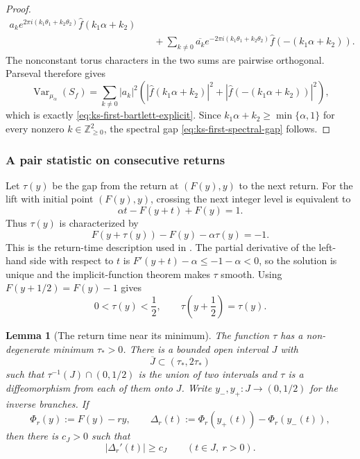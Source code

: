 \documentclass[11pt,reqno,a4paper]{amsart}
\numberwithin{equation}{section}
\theoremstyle{compact}
\newtheorem{lemma}[lemma]{Lemma}
\theoremstyle{definition}
\theoremstyle{definition}
\newcommand{\Var}{\operatorname{Var}}
\begin{document}
\begin{proof}
\begin{align*}
   a_ke^{2\pi i(k_1\theta_1+k_2\theta_2)}
     \widehat f(k_1\alpha+k_2)\\
 &\quad+
   \sum_{k\neq0}
   \overline{a_k}e^{-2\pi i(k_1\theta_1+k_2\theta_2)}
     \widehat f(-(k_1\alpha+k_2)).
\end{align*}
The nonconstant torus characters in the two sums are pairwise orthogonal.
Parseval therefore gives
\begin{equation}\label{eq:ks-first-variance-parseval}
  \Var_{\mu_\alpha}(S_f)
  =\sum_{k\neq0}|a_k|^2
    \left(
      |\widehat f(k_1\alpha+k_2)|^2
      +|\widehat f(-(k_1\alpha+k_2))|^2
    \right),
\end{equation}
which is exactly \eqref{eq:ks-first-bartlett-explicit}.  Since
$k_1\alpha+k_2\geq\min\{\alpha,1\}$ for every nonzero
$k\in\mathbb Z_{\geq0}^2$, the spectral gap
\eqref{eq:ks-first-spectral-gap} follows.
\end{proof}

\subsubsection{A pair statistic on consecutive returns}

Let $\tau(y)$ be the gap from the return at $(F(y),y)$ to the next return.
For the lift with initial point $(F(y),y)$, crossing the next integer level is
equivalent to
\[
  \alpha t-F(y+t)+F(y)=1.
\]
Thus $\tau(y)$ is characterized by
\begin{equation}\label{eq:ks-return-equation}
  F(y+\tau(y))-F(y)-\alpha\tau(y)=-1.
\end{equation}
This is the return-time description used in \cite[Lemma~6.6]{AV24}.  The
partial derivative of the left-hand side with respect to $t$ is
$F'(y+t)-\alpha\leq-1-\alpha<0$, so the solution is unique and the
implicit-function theorem makes $\tau$ smooth.  Using
$F(y+1/2)=F(y)-1$ gives
\begin{equation}\label{eq:ks-return-range}
  0<\tau(y)<\frac12,
  \qquad
  \tau\!\left(y+\frac12\right)=\tau(y).
\end{equation}
\begin{lemma}[The return time near its minimum]
\label{lem:ks-return-geometry}
The function $\tau$ has a non-degenerate minimum $\tau_*>0$.  There is a
bounded open interval $J$ with
\begin{equation}\label{eq:ks-gap-test-interval}
  \overline J\subset(\tau_*,2\tau_*)
\end{equation}
such that $\tau^{-1}(J)\cap(0,1/2)$ is the union of two intervals and $\tau$
is a diffeomorphism from each of them onto $J$.  Write
$y_-,y_+:J\to(0,1/2)$ for the inverse branches.  If
\begin{equation}\label{eq:ks-phase-functions}
  \Phi_r(y):=F(y)-ry,
  \qquad
  \Delta_r(t):=\Phi_r(y_+(t))-\Phi_r(y_-(t)),
\end{equation}
then there is $c_J>0$ such that
\begin{equation}\label{eq:ks-branch-phase-derivative}
  |\Delta_r'(t)|\geq c_J
  \qquad(t\in J,\ r>0).
\end{equation}
\end{lemma}
\end{document}
